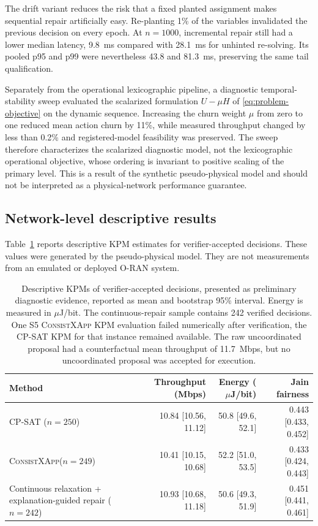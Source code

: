 \documentclass[pdflatex,sn-mathphys-num,iicol,oneside]{sn-jnl}
\newcommand{\method}{\textsc{ConsistXApp}\xspace}
\newcommand{\cpsat}{\textsc{CP-SAT}\xspace}
\begin{document}
The drift variant reduces the risk that a fixed planted assignment
makes sequential repair artificially easy. Re-planting 1\% of the
variables invalidated the previous decision on every epoch. At
$n=1000$, incremental repair still had a lower median latency,
9.8~ms compared with 28.1~ms for unhinted re-solving. Its pooled p95
and p99 were nevertheless 43.8 and 81.3~ms, preserving the same tail
qualification.

Separately from the operational lexicographic pipeline, a diagnostic
temporal-stability sweep evaluated the scalarized formulation
$U-\mu H$ of \eqref{eq:problem-objective} on the dynamic sequence.
Increasing the churn weight $\mu$ from zero to one reduced mean action
churn by 11\%, while measured throughput changed by less than 0.2\%
and registered-model feasibility was preserved. The sweep therefore
characterizes the scalarized diagnostic model, not the lexicographic
operational objective, whose ordering is invariant to positive
scaling of the primary level. This is a result of
the synthetic pseudo-physical model and should not be interpreted as
a physical-network performance guarantee.

\subsection{Network-level descriptive results}
\label{sec:kpi-results}

Table~\ref{tab:kpi} reports descriptive KPM estimates for
verifier-accepted decisions. These values were generated by the
pseudo-physical model. They are not measurements from an emulated or
deployed O-RAN system.

\begin{table}[t]
\centering
\caption{
Descriptive KPMs of verifier-accepted decisions, presented as preliminary diagnostic evidence, reported as mean and
bootstrap 95\% interval. Energy is measured in $\mu$J/bit. The
continuous-repair sample contains 242 verified decisions. One S5
\method KPM evaluation failed numerically after verification, the
\cpsat KPM for that instance remained available. The raw
uncoordinated proposal had a counterfactual mean throughput of
11.7~Mbps, but no uncoordinated proposal was accepted for execution.
}
\label{tab:kpi}
\setlength{\tabcolsep}{4pt}
\small

\begin{tabular}{lrrr}
\toprule
Method &
Throughput (Mbps) &
Energy ($\mu$J/bit) &
Jain fairness\\
\midrule

\cpsat{} ($n=250$)
&
10.84 [10.56, 11.12]
&
50.8 [49.6, 52.1]
&
0.443 [0.433, 0.452]
\\

\method ($n=249$)
&
10.41 [10.15, 10.68]
&
52.2 [51.0, 53.5]
&
0.433 [0.424, 0.443]
\\

\shortstack[l]{Continuous relaxation +\\explanation-guided repair ($n=242$)}
&
10.93 [10.68, 11.18]
&
50.6 [49.3, 51.9]
&
0.451 [0.441, 0.461]
\\

\bottomrule
\end{tabular}
\normalsize
\end{table}
\end{document}
